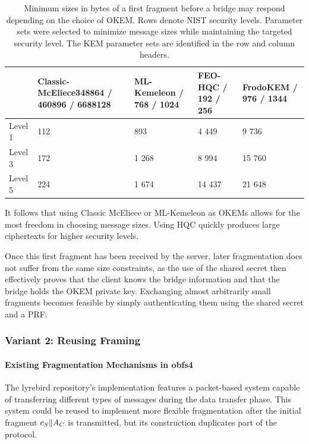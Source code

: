 \begin{table}
    \centering \small
    \begin{tabular}{@{} L{0.1\textwidth-\tabcolsep} | R{0.3\tabcolsep} R{0.2\tabcolsep} R{0.2\tabcolsep} R{0.2\textwidth-\tabcolsep} @{}}
        & Classic-McEliece\newline \footnotesize 348864 / 460896 / 6688128
        & ML-Kemeleon / 768 / 1024
        & FEO-HQC / 192 / 256
        & FrodoKEM / 976 / 1344
        \\ \hline
    Level 1 & 112 & 893 & 4 449 & 9 736 \\
    Level 3 & 172 & 1 268 & 8 994 & 15 760 \\
    Level 5 & 224 & 1 674 & 14 437 & 21 648
    \end{tabular}
    \caption[
        Minimum sizes in bytes of a first fragment before a bridge may respond depending on the choice of OKEM.
    ]{
        Minimum sizes in bytes of a first fragment before a bridge may respond depending on the choice of OKEM. Rows denote NIST security levels. Parameter sets were selected to minimize message sizes while maintaining the targeted security level. The KEM parameter sets are identified in the row and column headers.
    }
    \label{tab:frag-min-needed}
\end{table}

It follows that using Classic McEliece or ML-Kemeleon as OKEMs allows for the most freedom in choosing message sizes. Using HQC quickly produces large ciphertexts for higher security levels.

Once this first fragment has been received by the server, later fragmentation does not suffer from the same size constraints, as the use of the shared secret then effectively proves that the client knows the bridge information and that the bridge holds the OKEM private key. Exchanging almost arbitrarily small fragments becomes feasible by simply authenticating them using the shared secret and a PRF.

\subsubsection{Variant 2: Reusing \obfsfour{} Framing} \label{sssec:variant-framing}

\paragraph{Existing Fragmentation Mechanisms in obfs4}
The lyrebird repository's \obfsfour{} implementation features a packet-based system capable of transferring different types of messages during the data transfer phase. This system could be reused to implement more flexible fragmentation after the initial fragment $c_S \| A_C$ is transmitted, but its construction duplicates part of the \drivel{} protocol.

